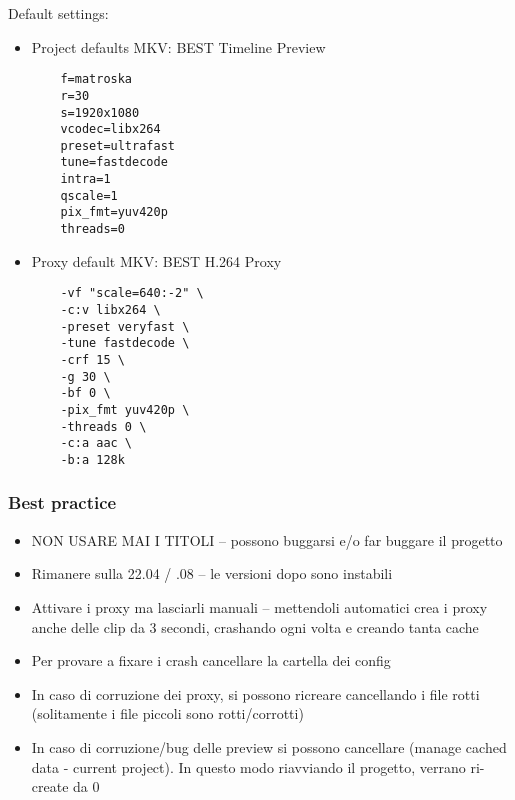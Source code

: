 \documentclass[12pt]{article}
\begin{document}
Default settings:
\begin{itemize}
    \item Project defaults MKV: BEST Timeline Preview
    \begin{lstlisting}
    f=matroska
    r=30
    s=1920x1080
    vcodec=libx264
    preset=ultrafast
    tune=fastdecode
    intra=1
    qscale=1
    pix_fmt=yuv420p
    threads=0
    \end{lstlisting}

    \item Proxy default MKV: BEST H.264 Proxy

    \begin{lstlisting}
    -vf "scale=640:-2" \
    -c:v libx264 \
    -preset veryfast \
    -tune fastdecode \
    -crf 15 \
    -g 30 \
    -bf 0 \
    -pix_fmt yuv420p \
    -threads 0 \
    -c:a aac \
    -b:a 128k
    \end{lstlisting}

\end{itemize}







\clearpage{}

\subsubsection{Best practice}


\begin{itemize}
    \item NON USARE MAI I TITOLI -- possono buggarsi e/o far buggare il progetto
    \item Rimanere sulla 22.04 / .08 -- le versioni dopo sono instabili
    \item Attivare i proxy ma lasciarli manuali -- mettendoli automatici crea i proxy anche delle clip da 3 secondi, crashando ogni volta e creando tanta cache
    \item Per provare a fixare i crash cancellare la cartella dei config 
    \item In caso di corruzione dei proxy, si possono ricreare cancellando i file rotti (solitamente i file piccoli sono rotti/corrotti)
    \item In caso di corruzione/bug delle preview si possono cancellare (manage cached data - current project). In questo modo riavviando il progetto, verrano ri-create da 0
\end{itemize}
\end{document}
